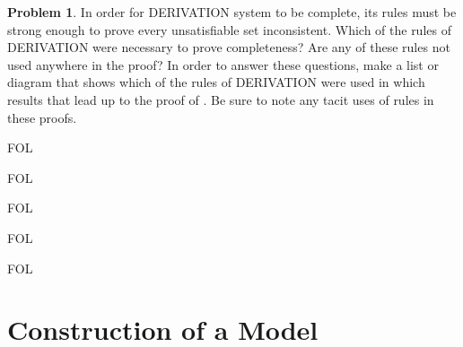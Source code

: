\documentclass[10pt,a4paper]{article}
\makeatletter
\newcommand*{\olup}[1]{\MakeUppercase{#1}}
\theoremstyle{plain}
\theoremstyle{definition}
\newtheorem{prob}{Problem}[section]
\theoremstyle{remark}
\newcommand*{\olfileid}[3]{}
\newcommand*{\olsection}[1]{\section*{#1}}
\newcommand*{\olchapter}[3]{}
\newcommand*{\olimport}[1]{}
\newcommand{\olref}{\@ifnextchar[{\olref@i}{\olref@final}}
\def\olref@i[#1]{\@ifnextchar[{\olref@ii}{\olref@final}}
\def\olref@ii[#1]{\@ifnextchar[{\olref@iii}{\olref@final}}
\def\olref@iii[#1]{\olref@final}
\def\olref@final#1{\ref{#1}}
\providecommand{\iftag}[1]{#1}
\providecommand{\iftag}{}
\makeatother
\begin{document}
\begin{prob}
In order for \olup{derivation} system to be complete, its rules must be
strong enough to prove every unsatisfiable set inconsistent.  Which of
the rules of \olup{derivation} were necessary to prove completeness?  Are any
of these rules not used anywhere in the proof?  In order to answer
these questions, make a list or diagram that shows which of the rules
of \olup{derivation} were used in which results that lead up to the proof of
\olref[pl][com][cth]{thm:completeness}.  Be sure to note any tacit
uses of rules in these proofs.
\end{prob}
\tagendprob





\iftag{FOL}
      {\olchapter{fol}{com}{The Completeness Theorem}}
      {\olchapter{pl}{com}{The Completeness Theorem}}

\olimport{introduction}

\olimport{outline}

\olimport{complete-consistent-sets}

\iftag{FOL}{%
  \olimport{henkin-expansions}
}{}

\olimport{lindenbaums-lemma}

\olimport{construction-of-model}

\iftag{FOL}{%
  \olimport{identity}
}{}

\olimport{completeness-thm}

\olimport{compactness}

\olimport{compactness-direct}

\iftag{FOL}{%
  \olimport{downward-ls}
}{}

\OLEndChapterHook





\iftag{FOL}
      {\olfileid{fol}{com}{mod}}
      {\olfileid{pl}{com}{mod}}

\olsection{Construction of a Model}
\end{document}
